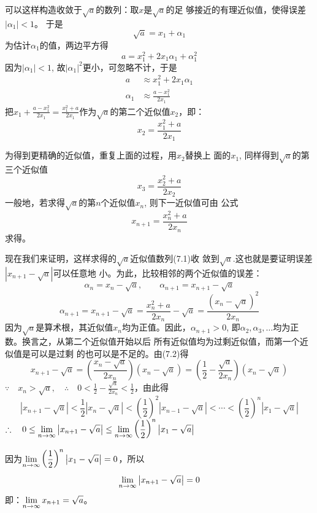 \begin{solution}
可以这样构造收敛于$\sqrt{a}$的数列：取$x$是$\sqrt{a}$的足
够接近的有理近似值，使得误差$|\alpha_1|<1$。
于是
\[\sqrt{a}=x_1+\alpha_1\]
为估计$\alpha_1$的值，两边平方得
\[a=x^2_1+2x_1\alpha_1+\alpha_1^2\]
因为$|\alpha_1|<1$, 故$|\alpha_1|^2$更小，可忽略不计，于是
\[\begin{split}
    a&\approx x^2_1+2x_1\alpha_1\\
    \alpha_1&\approx \frac{a-x^2_1}{2x_1}
\end{split}\]
把$x_1+\frac{a-x^2_1}{2x_1}=\frac{x^2_1+a}{2x_1}$作为$\sqrt{a}$的第二个近似值$x_2$，即：
\[x_2=\frac{x^2_1+a}{2x_1}\]

为得到更精确的近似值，重复上面的过程，用$x_2$替换上
面的$x_1$, 同样得到$\sqrt{a}$的第三个近似值
\[x_3=\frac{x^2_2+a}{2x_2}\]
一般地，若求得$\sqrt{a}$的第$n$个近似值$x_n$, 则下一近似值可由
公式
\begin{equation}
    x_{n+1}=\frac{x^2_n+a}{2x_n}
\end{equation}
求得。

现在我们来证明，这样求得的$\sqrt{a}$近似值数列(7.1)收
敛到$\sqrt{a}$.这也就是要证明误差$|x_{n+1}-\sqrt{a}|$可以任意地
小。为此，比较相邻的两个近似值的误差：
\[\alpha_n=x_n-\sqrt{a},\qquad \alpha_{n+1}=x_{n+1}-\sqrt{a}\]
\begin{equation}
    \alpha_{n+1}=x_{n+1}-\sqrt{a}=\frac{x^2_n+a}{2x_n}-\sqrt{a}=\frac{\left(x_n-\sqrt{a}\right)^2}{2x_n}
\end{equation}
因为$\sqrt{a}$是算术根，其近似值$x_n$均为正值。因此，$\alpha_{n+1}>0$, 即$\alpha_2,\alpha_3,\ldots$均为正数。换言之，从第二个近似值开始以后
所有近似值均为过剩近似值，而第一个近似值是可以是过剩
的也可以是不足的。由(7.2)得
\[x_{n+1}-\sqrt{a}=\left(\frac{x_n-\sqrt{a}}{2x_n}\right)\left(x_n-\sqrt{a}\right)=\left(\frac{1}{2}-\frac{\sqrt{a}}{2x_n}\right)\left(x_n-\sqrt{a}\right)\]
$\because\quad x_n>\sqrt{a},\quad \therefore\quad 0<\frac{1}{2}-\frac{\sqrt{a}}{2x_n}<\frac{1}{2}$，由此得
\[\left|x_{n+1}-\sqrt{a}\right|<\frac{1}{2}\left|x_n-\sqrt{a}\right|<\left(\frac{1}{2}\right)^2\left|x_{n-1}-\sqrt{a}\right|<\cdots <\left(\frac{1}{2}\right)^n\left|x_1-\sqrt{a}\right|\]
$\therefore\quad 0\le \displaystyle\lim_{n\to\infty} \left|x_{n+1}-\sqrt{a}\right|\le \displaystyle\lim_{n\to\infty}\left(\dfrac{1}{2}\right)^n\left|x_1-\sqrt{a}\right|$

因为$\displaystyle\lim_{n\to\infty}\left(\dfrac{1}{2}\right)^n\left|x_1-\sqrt{a}\right|=0$，所以$$\displaystyle\lim_{n\to\infty}\left|x_{n+1}-\sqrt{a}\right|=0$$
即：$\displaystyle\lim_{n\to\infty} x_{n+1}=\sqrt{a}$。
\end{solution}

